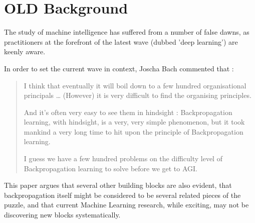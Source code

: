 \documentclass[citeauthoryear]{llncs}
\begin{document}
\section{OLD Background}
The study of machine intelligence has suffered from a number of false dawns, 
as practitioners at the forefront of the latest wave (dubbed 'deep learning') 
are keenly aware.  
%

In order to set the current wave in context, Joscha Bach \cite{Joscha-Bach-2012-interview}
commented that :

\begin{quotation}

I think that eventually it will boil down to a few hundred organisational principals
\dots
%
%
%
(However) it is very difficult to find the organising principles.

And it's often very easy to see them in hindsight : 
Backpropagation learning, with hindsight, is a very, very simple phenomenon, 
but it took mankind a very long time to hit upon the principle of Backpropagation learning. 

I guess we have a few hundred problems on the difficulty level of Backpropagation learning to solve before we get to AGI. 


\end{quotation}

This paper argues that several other building blocks are also evident, 
that backpropagation itself might be considered to be several related pieces of the puzzle,
and that current Machine Learning research, while exciting, may not be
discovering new blocks systematically.
\end{document}
